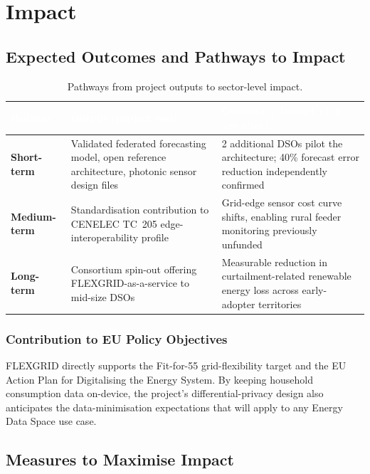 \documentclass[11pt,a4paper,parskip=half]{scrreprt}
\begin{document}
\chapter{Impact}

\section{Expected Outcomes and Pathways to Impact}

\begin{table}[h]
\small
\renewcommand{\arraystretch}{1.3}
\begin{tabularx}{\linewidth}{@{}>{\sffamily\bfseries}p{2.1cm} X X@{}}
\toprule
\rowcolor{eublue}
\textcolor{white}{Horizon} & \textcolor{white}{Output (project end)} & \textcolor{white}{Outcome / Impact (2--5 yrs after)} \\
\midrule
Short-term & Validated federated forecasting model, open reference architecture, photonic
sensor design files & 2 additional DSOs pilot the architecture; 40\% forecast error reduction
independently confirmed \\
\addlinespace
Medium-term & Standardisation contribution to CENELEC TC~205 edge-interoperability profile &
Grid-edge sensor cost curve shifts, enabling rural feeder monitoring previously unfunded \\
\addlinespace
Long-term & Consortium spin-out offering FLEXGRID-as-a-service to mid-size DSOs & Measurable
reduction in curtailment-related renewable energy loss across early-adopter territories \\
\bottomrule
\end{tabularx}
\caption{Pathways from project outputs to sector-level impact.}
\end{table}

\subsection{Contribution to EU Policy Objectives}

FLEXGRID directly supports the Fit-for-55 grid-flexibility target and the EU Action Plan for
Digitalising the Energy System. By keeping household consumption data on-device, the project's
differential-privacy design also anticipates the data-minimisation expectations that will apply
to any Energy Data Space use case.

\section{Measures to Maximise Impact}
\end{document}
